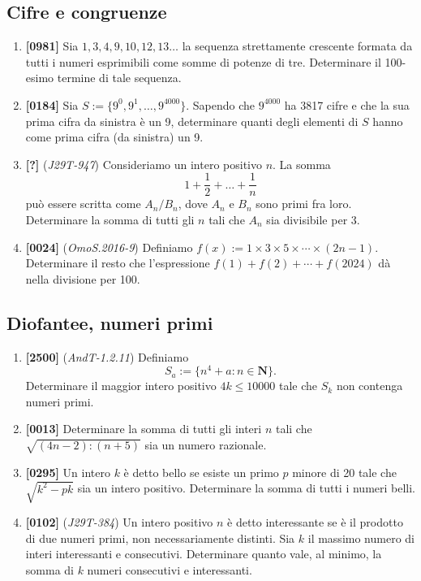 \documentclass[10pt]{article}
\begin{document}
\subsection{Cifre e congruenze}
\begin{enumerate}
	\item \textbf{[0981]} Sia $1,3,4,9,10,12,13\dots$ la sequenza strettamente crescente formata da tutti i numeri esprimibili come somme di potenze di tre. Determinare il 100-esimo termine di tale sequenza.

	\item \textbf{[0184]} Sia $S:=\{9^0, 9^1,\dots, 9^{4000} \}$. Sapendo che $9^{4000}$ ha 3817 cifre e che la sua prima cifra da sinistra è un 9, determinare quanti degli elementi di $S$ hanno come prima cifra (da sinistra) un 9.

	\item \textbf{[?]} (\textit{J29T-947}) Consideriamo un intero positivo $n$. La somma
		\begin{equation*}
			1+\frac{1}{2}+\dots+\frac{1}{n}
		\end{equation*}
		può essere scritta come $A_n/B_n$, dove $A_n$ e $B_n$ sono primi fra loro. Determinare la somma di tutti gli $n$ tali che $A_n$ sia divisibile per 3.

	\item \textbf{[0024]} (\textit{OmoS.2016-9}) Definiamo $f(x):=1\times 3\times 5\times \cdots \times (2n-1)$. Determinare il resto che l'espressione $f(1)+f(2)+\cdots+f(2024)$ dà nella divisione per 100.

\end{enumerate}

\subsection{Diofantee, numeri primi}
\begin{enumerate}
	\item \textbf{[2500]} (\textit{AndT-1.2.11}) Definiamo
		\begin{equation*}
			S_a:=\{ n^4+a : n\in \mathbf{N} \}.
		\end{equation*}
		Determinare il maggior intero positivo $4k\le 10000$
		tale che $S_k$ non contenga numeri primi.

	\item \textbf{[0013]} Determinare la somma di tutti gli interi $n$ tali che $\sqrt{(4n-2):(n+5)}$ sia un numero razionale.

	\item \textbf{[0295]} Un intero $k$ è detto bello se esiste
		un primo $p$ minore di 20 tale che $\sqrt {k^2-pk}$
		sia un intero positivo. Determinare la somma di tutti i numeri belli.

	\item \textbf{[0102]} (\textit{J29T-384}) Un intero positivo $n$ è detto interessante se è il prodotto di due numeri primi, non necessariamente distinti. Sia $k$ il massimo numero di interi interessanti e consecutivi. Determinare quanto vale, al minimo, la somma di $k$ numeri consecutivi e interessanti.
\end{enumerate}
\end{document}
